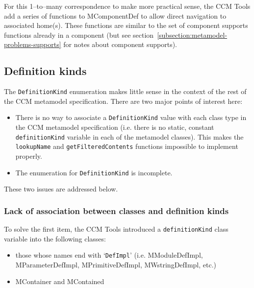 For this 1--to--many correspondence to make more practical sense, the CCM Tools
add a series of functions to MComponentDef to allow direct navigation to
associated home(s). These functions are similar to the set of component supports
functions already in a component (but see
section~\ref{subsection:metamodel-problems-supports} for notes about component
supports).

\subsection{Definition kinds}

The {\tt DefinitionKind} enumeration makes little sense in the context of the
rest of the CCM metamodel specification. There are two major points of interest
here:

\begin{itemize}
\item There is no way to associate a {\tt DefinitionKind} value with each class
      type in the CCM metamodel specification (i.e. there is no static, constant
      {\tt definitionKind} variable in each of the metamodel classes). This
      makes the {\tt lookupName} and {\tt getFilteredContents} functions
      impossible to implement properly.
\item The enumeration for {\tt DefinitionKind} is incomplete.
\end{itemize}

These two issues are addressed below.

\subsubsection{Lack of association between classes and definition kinds}

To solve the first item, the CCM Tools introduced a {\tt definitionKind} class
variable into the following classes:

\begin{itemize}
\item those whose names end with `{\tt DefImpl}' (i.e. MModuleDefImpl,
      MParameterDefImpl, MPrimitiveDefImpl, MWstringDefImpl, etc.)
\item MContainer and MContained
\end{itemize}


